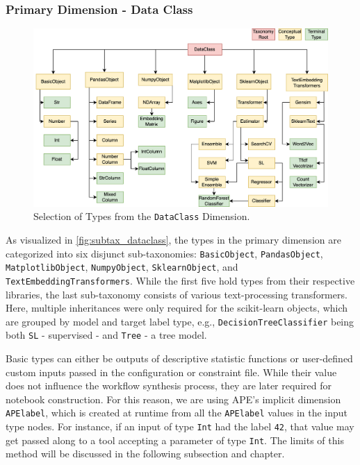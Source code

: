 \subsubsection{Primary Dimension - Data Class}
\begin{figure}[h]
    \centering
    \includegraphics[width=\linewidth]{Tex//images/DataClassSimple.png}
    \caption{Selection of Types from the \texttt{DataClass} Dimension.}
    \label{fig:subtax_dataclass}
\end{figure}
As visualized in \autoref{fig:subtax_dataclass}, the types in the primary dimension are categorized into six disjunct sub-taxonomies: \texttt{BasicObject}, \texttt{PandasObject}, \texttt{MatplotlibObject}, \texttt{NumpyObject}, \texttt{SklearnObject}, and \texttt{TextEmbeddingTransformers}. While the first five hold types from their respective libraries, the last sub-taxonomy consists of various text-processing transformers. Here, multiple inheritances were only required for the scikit-learn objects, which are grouped by model and target label type, e.g., \verb|DecisionTreeClassifier| being both \verb|SL| - supervised - and \verb|Tree| - a tree model.

Basic types can either be outputs of descriptive statistic functions or user-defined custom inputs passed in the configuration or constraint file. While their value does not influence the workflow synthesis process, they are later required for notebook construction. For this reason, we are using APE’s implicit dimension \verb|APElabel|, which is created at runtime from all the \verb|APElabel| values in the input type nodes. For instance, if an input of type \verb|Int| had the label \verb|42|, that value may get passed along to a tool accepting a parameter of type \verb|Int|. The limits of this method will be discussed in the following subsection and chapter.

